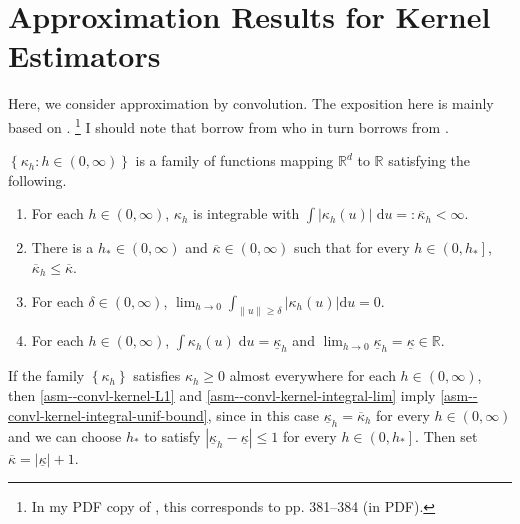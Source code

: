 
\section{Approximation Results for Kernel Estimators}

Here, we consider approximation by convolution.
The exposition here is mainly based on
\citet[pp. 362--365]{1999paganNonparametricEconometrics}.%
\footnote{In my PDF copy of \citet{1999paganNonparametricEconometrics}, this
corresponds to pp. 381--384 (in PDF).}
I should note that \citet{1999paganNonparametricEconometrics} borrow from
\citet{1962parzenEstimationProbabilityDensity} who in turn borrows from
\citet{1955bochnerHarmonicAnalysisTheory}.

\begin{assumption}
\label{asm--convl-kernel}
\(\left\{ \kappa_{h} : h \in (0, \infty) \right\}\) is a family of
functions mapping \(\mathbb{R}^{d}\) to \(\mathbb{R}\)
satisfying the following.
\begin{enumerate}[label=(\roman*)]
  \item \label{asm--convl-kernel-L1}
    For each \(h \in (0, \infty)\), \(\kappa_{h}\) is integrable with
    \(\int \left| \kappa_{h} (u) \right| \; \mathrm{d} u =:
    \overline{\kappa}_{h} < \infty\).
  \item \label{asm--convl-kernel-integral-unif-bound}
    There is a \(h_{\ast} \in (0, \infty)\) and \(\overline{\kappa} \in (0,
    \infty)\) such that for every \(h \in \left( 0, h_{\ast} \right]\),
    \(\overline{\kappa}_{h} \leq \overline{\kappa}\).
  \item \label{asm--convl-kernel-conv-prob}
    For each \(\delta \in (0, \infty)\), \(\lim_{h \to 0} \int_{\|u\| \geq
    \delta} \left| \kappa_{h} (u) \right| \mathrm{d} u = 0\).
  \item \label{asm--convl-kernel-integral-lim}
    For each \(h \in (0, \infty)\), \(\int \kappa_{h} (u) \; \mathrm{d} u =
    \underline{\kappa}_{h}\) and \(\lim_{h \to 0} \underline{\kappa}_{h} =
    \underline{\kappa} \in \mathbb{R}\).
\end{enumerate}
\end{assumption}

\begin{remark}
If the family \(\left\{ \kappa_{h} \right\}\) satisfies \(\kappa_{h} \geq 0\)
almost everywhere for each \(h \in (0, \infty)\), then 
\ref{asm--convl-kernel-L1} and \ref{asm--convl-kernel-integral-lim} imply
\ref{asm--convl-kernel-integral-unif-bound}, since in this case
\(\underline{\kappa}_{h} = \overline{\kappa}_{h}\) for every \(h \in (0,
\infty)\) and we can choose \(h_{\ast}\) to satisfy \(\left|
\underline{\kappa}_{h} - \underline{\kappa}
\right| \leq 1\) for every \(h \in \left( 0, h_{\ast} \right]\).
Then set \(\overline{\kappa} = \left| \underline{\kappa} \right| + 1\).
\end{remark}

